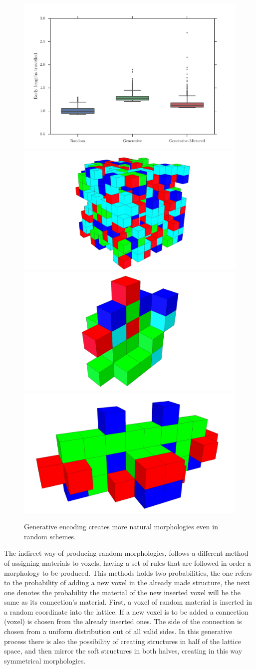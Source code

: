 \begin{figure}
\centering
\includegraphics[width=1.0\textwidth]{../Figures/Results/random.pdf}\\
\hspace{0.1cm}
\includegraphics[height=0.15\textwidth]{../Figures/Robots/random.jpg}
\includegraphics[height=0.15\textwidth]{../Figures/Robots/rg0.jpg}
\includegraphics[height=0.15\textwidth]{../Figures/Robots/rg1.jpg}
\caption{Generative encoding creates more natural morphologies even in random schemes.}
\label{fig:randomResultsRobots}
\end{figure}

The indirect way of producing random morphologies, follows a different method of assigning materials to voxels, having a set of rules that are followed in order a morphology to be produced. This methods holds two probabilities, the one refers to the probability of adding a new voxel in the already made structure, the next one denotes the probability the material of the new inserted voxel will be the same as its connection's material. First, a voxel of random material is inserted in a random coordinate into the lattice. If a new voxel is to be added a connection (voxel) is chosen from the already inserted ones. The side of the connection is chosen from a uniform distribution out of all valid sides. In this generative process there is also the possibility of creating structures in half of the lattice space, and then mirror the soft structures in both halves, creating in this way symmetrical morphologies.


